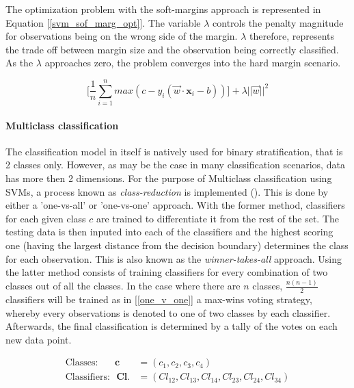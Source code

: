 	The optimization problem with the soft-margins approach is represented in Equation [\ref{svm_sof_marg_opt}]. The variable $\lambda$ controls the penalty magnitude for observations being on the wrong side of the margin. $\lambda$ therefore, represents the trade off between margin size and the observation being correctly classified. As the $\lambda$ approaches zero, the problem converges into the hard margin scenario.

	\begin{equation}
		\Bigg[
		\frac{1}{n} \sum_{i=1}^{n}max(c-y_i(\vec{w} \cdot \textbf{x}_i - b )) 
		\Bigg]
		+ \lambda || \vec{w} ||^2
		\label{svm_sof_marg_opt}
	\end{equation}

\paragraph{Multiclass classification}
	The classification model in itself is natively used for binary stratification, that is 2 classes only. However, as may be the case in many classification scenarios, data has more then 2 dimensions. For the purpose of Multiclass classification using SVMs, a process known as \textit{class-reduction} is implemented (\cite{aly2005survey}). This is done by either a 'one-vs-all' or 'one-vs-one' approach. With the former method, classifiers for each given class $c$ are trained to differentiate it from the rest of the set. The testing data is then inputed into each of the classifiers and the highest scoring one (having the largest distance from the decision boundary) determines the class for each observation. This is also known as the \textit{winner-takes-all} approach. Using the latter method consists of training classifiers for every combination of two classes out of all the classes. In the case where there are $n$ classes, $\frac{n(n-1)}{2} $ classifiers will be trained as in [\ref{one_v_one}]
	a max-wins voting strategy, whereby every observations is denoted to one of two classes by each classifier. Afterwards, the final classification is determined by a tally of the votes on each new data point.
	
	\begin{equation}
		\begin{aligned}
			\text{Classes:}	\ \ \ \ \ \ \ \	\textbf{c} &= (c_1,c_2,c_3,c_4) \\
			\text{Classifiers:}\ \ \ 	\textbf{Cl.} &= (Cl_{12},Cl_{13},Cl_{14},Cl_{23},Cl_{24},Cl_{34})
		\end{aligned}	
		\label{one_v_one}
	\end{equation}


